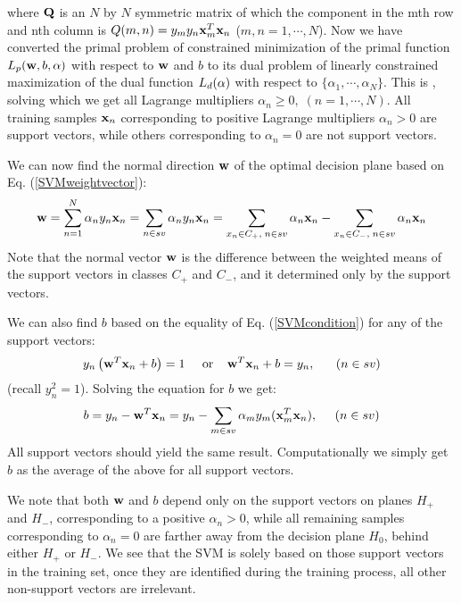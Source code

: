 \documentclass{article}
\begin{document}
where ${\bf Q}$ is an $N$ by $N$ symmetric matrix of which the component
in the mth row and nth column is $Q(m,n)=y_my_n{\bf x}_m^T{\bf x}_n$ 
($m,n=1,\cdots,N$). Now we have converted the primal problem of 
constrained minimization of the primal function $L_p({\bf w},b,{\bf\alpha})$ 
with respect to ${\bf w}$ and $b$ to its dual problem of linearly
constrained maximization of the dual function $L_d({\bf \alpha})$ 
with respect to $\{\alpha_1,\cdots,\alpha_N\}$. This is 
,
solving which we get all Lagrange multipliers 
$\alpha_n\ge 0,\;(n=1,\cdots,N)$.
All training samples ${\bf x}_n$ corresponding to positive Lagrange 
multipliers $\alpha_n>0$ are support vectors, while others corresponding
to $\alpha_n=0$ are not support vectors.

We can now find the normal direction ${\bf w}$ of the optimal decision
plane based on Eq. (\ref{SVMweightvector}):
\begin{equation}
  {\bf w}=\sum_{n=1}^N \alpha_n y_n {\bf x}_n
  =\sum_{n\in sv} \alpha_ny_n{\bf x}_n
  =\sum_{x_n\in C_+,\;n\in sv} \alpha_n{\bf x}_n
  -\sum_{x_n\in C_-,\;n\in sv} \alpha_n{\bf x}_n
  \label{FindW}
\end{equation}
Note that the normal vector ${\bf w}$ is the difference between the
weighted means of the support vectors in classes $C_+$ and $C_-$, and
it determined only by the support vectors.

We can also find $b$ based on the equality of Eq. (\ref{SVMcondition}) 
for any of the support vectors:
\begin{equation}
  y_n \left( {\bf w}^T {\bf x}_n+b\right) = 1\;\;\;\;\;\mbox{or}\;\;\;\;
  {\bf w}^T {\bf x}_n+b = y_n,\;\;\;\;\;\;(n\in sv)
\end{equation}
(recall $y_n^2=1$). Solving the equation for $b$ we get:
\begin{equation}
  b = y_n-{\bf w}^T {\bf x}_n
  =y_n-\sum_{m \in sv} \alpha_m y_m( {\bf x}_m^T{\bf x}_n),\;\;\;\;\;(n\in sv)
  \label{FindB}
\end{equation}
All support vectors should yield the same result. Computationally we 
simply get $b$ as the average of the above for all support vectors.

We note that both ${\bf w}$ and $b$ depend only on the support vectors 
on planes $H_+$ and $H_-$, corresponding to a positive $\alpha_n>0$, 
while all remaining samples corresponding to $\alpha_n=0$ are farther 
away from the decision plane $H_0$, behind either $H_+$ or $H_-$. We 
see that the SVM is solely based on those support vectors in the
training set, once they are identified during the training process, 
all other non-support vectors are irrelevant.
\end{document}
